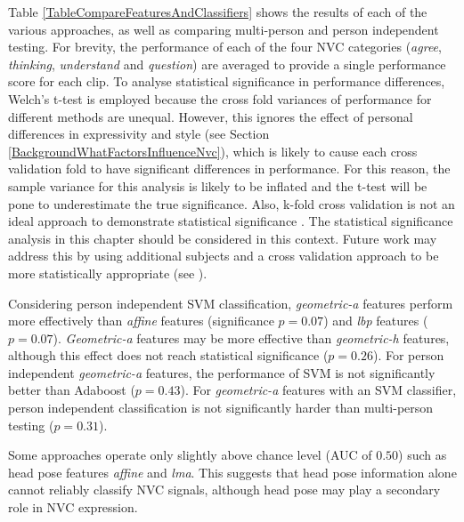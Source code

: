 

Table \ref{TableCompareFeaturesAndClassifiers} shows the results of each of the various \featureGeneration approaches, as well as comparing multi-person and person independent testing. For brevity, the performance of each of the four \ac{NVC} categories (\textit{agree}, \textit{thinking}, \textit{understand} and \textit{question}) are averaged to provide a single performance score for each clip. To analyse statistical significance in performance differences, Welch's t-test \cite{Welch1947} is employed because the cross fold variances of performance for different methods are unequal. However, this ignores the effect of personal differences in expressivity and style (see Section \ref{BackgroundWhatFactorsInfluenceNvc}), which is likely to cause each cross validation fold to have significant differences in performance. For this reason, the sample variance for this analysis is likely to be inflated and the t-test will be pone to underestimate the true significance. Also, k-fold cross validation is not an ideal approach to demonstrate statistical significance \cite{Dietterich1998}. The statistical significance analysis in this chapter should be considered in this context. Future work may address this by using additional subjects and a cross validation approach to be more statistically appropriate (see \cite{Grandvalet2006}).

Considering person independent SVM classification, \textit{geometric-a} features perform more effectively than \textit{affine} features (significance $p=0.07$) and \textit{lbp} features ($p=0.07$). \textit{Geometric-a} features may be more effective than \textit{geometric-h} features, although this effect does not reach statistical significance ($p=0.26$). For person independent \textit{geometric-a} features, the performance of SVM is not significantly better than Adaboost ($p=0.43$). For \textit{geometric-a} features with an SVM classifier, person independent classification is not significantly harder than multi-person testing ($p=0.31$). 

Some approaches operate only slightly above chance level (\ac{AUC} of $0.50$) such as head pose features \textit{affine} and \textit{lma}. This suggests that head pose information alone cannot reliably classify \ac{NVC} signals, although head pose may play a secondary role in \ac{NVC} expression.

